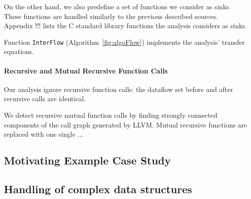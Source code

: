 On the other hand, we also predefine a set of functions
we consider as sinks. These functions are handled similarly
to the previous described sources. Appendix !!! lists
the C standard library functions the analysis considers
as sinks.

Function \texttt{InterFlow} (Algorithm~\ref{fig:algoFlow})
implements the analysis' transfer equations.

\paragraph{Recursive and Mutual Recursive Function Calls} 

Our analysis ignore recursive function calls: the dataflow set
before and after recursive calls are identical. 

We detect recursive mutual function calls by finding strongly
connected components of the call graph generated by LLVM.
Mutual recursive functions are replaced with one single ...


\subsection{Motivating Example Case Study}\label{sec:sampleSummary}

\subsection{Handling of complex data structures}

